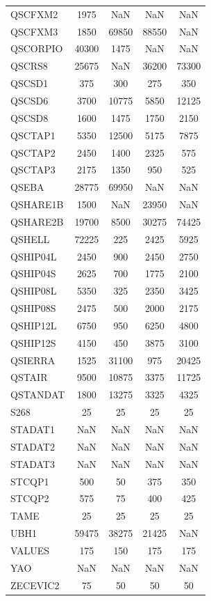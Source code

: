 \begin{longtable}{lcccc}
QSCFXM2  &     1975 &   NaN &      NaN &      NaN \\
QSCFXM3  &     1850 & 69850 &    88550 &      NaN \\
QSCORPIO &    40300 &  1475 &      NaN &      NaN \\
QSCRS8   &    25675 &   NaN &    36200 &    73300 \\
QSCSD1   &      375 &   300 &      275 &      350 \\
QSCSD6   &     3700 & 10775 &     5850 &    12125 \\
QSCSD8   &     1600 &  1475 &     1750 &     2150 \\
QSCTAP1  &     5350 & 12500 &     5175 &     7875 \\
QSCTAP2  &     2450 &  1400 &     2325 &      575 \\
QSCTAP3  &     2175 &  1350 &      950 &      525 \\
QSEBA    &    28775 & 69950 &      NaN &      NaN \\
QSHARE1B &     1500 &   NaN &    23950 &      NaN \\
QSHARE2B &    19700 &  8500 &    30275 &    74425 \\
QSHELL   &    72225 &   225 &     2425 &     5925 \\
QSHIP04L &     2450 &   900 &     2450 &     2750 \\
QSHIP04S &     2625 &   700 &     1775 &     2100 \\
QSHIP08L &     5350 &   325 &     2350 &     3425 \\
QSHIP08S &     2475 &   500 &     2000 &     2175 \\
QSHIP12L &     6750 &   950 &     6250 &     4800 \\
QSHIP12S &     4150 &   450 &     3875 &     3100 \\
QSIERRA  &     1525 & 31100 &      975 &    20425 \\
QSTAIR   &     9500 & 10875 &     3375 &    11725 \\
QSTANDAT &     1800 & 13275 &     3325 &     4325 \\
S268     &       25 &    25 &       25 &       25 \\
STADAT1  &      NaN &   NaN &      NaN &      NaN \\
STADAT2  &      NaN &   NaN &      NaN &      NaN \\
STADAT3  &      NaN &   NaN &      NaN &      NaN \\
STCQP1   &      500 &    50 &      375 &      350 \\
STCQP2   &      575 &    75 &      400 &      425 \\
TAME     &       25 &    25 &       25 &       25 \\
UBH1     &    59475 & 38275 &    21425 &      NaN \\
VALUES   &      175 &   150 &      175 &      175 \\
YAO      &      NaN &   NaN &      NaN &      NaN \\
ZECEVIC2 &       75 &    50 &       50 &       50 \\
\end{longtable}
